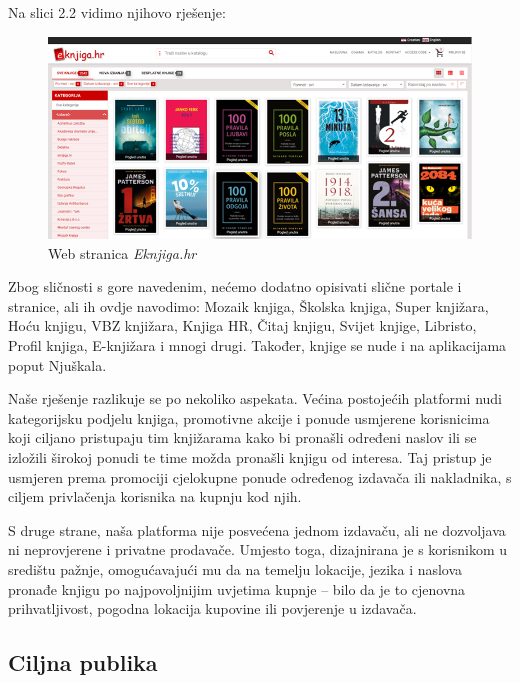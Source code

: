 		Na slici 2.2 vidimo njihovo rješenje:
		
			\begin{figure}[H]
				\includegraphics[scale=1]{slike/Eknjiga.PNG} %
				\centering
				\caption{Web stranica \textit{Eknjiga.hr}}
				\label{fig:Eknjiga}
			\end{figure}
		
		
		Zbog sličnosti s gore navedenim, nećemo dodatno opisivati slične portale i stranice, ali ih ovdje navodimo: Mozaik knjiga, Školska knjiga, Super knjižara, Hoću knjigu, VBZ knjižara, Knjiga HR, Čitaj knjigu, Svijet knjige, Libristo, Profil knjiga, E-knjižara i mnogi drugi. Također, knjige se nude i na aplikacijama poput Njuškala.
		
		Naše rješenje razlikuje se po nekoliko aspekata. Većina postojećih platformi nudi kategorijsku podjelu knjiga, promotivne akcije i ponude usmjerene korisnicima koji ciljano pristupaju tim knjižarama kako bi pronašli određeni naslov ili se izložili širokoj ponudi te time možda pronašli knjigu od interesa. Taj pristup je usmjeren prema promociji cjelokupne ponude određenog izdavača ili nakladnika, s ciljem privlačenja korisnika na kupnju kod njih. 
		
		S druge strane, naša platforma nije posvećena jednom izdavaču, ali ne dozvoljava ni neprovjerene i privatne prodavače. Umjesto toga, dizajnirana je s korisnikom u središtu pažnje, omogućavajući mu da na temelju lokacije, jezika i naslova pronađe knjigu po najpovoljnijim uvjetima kupnje – bilo da je to cjenovna prihvatljivost, pogodna lokacija kupovine ili povjerenje u izdavača.
		
		\subsection*{Ciljna publika}
		
